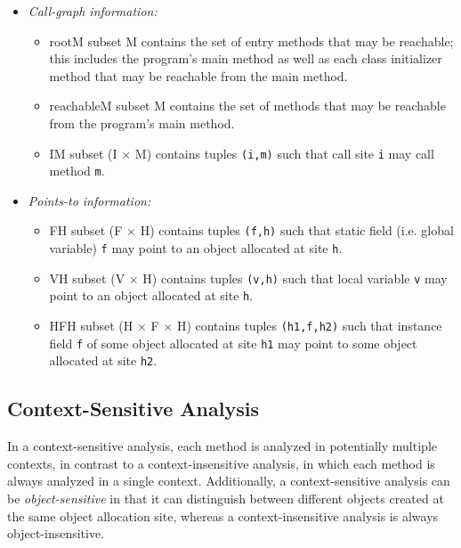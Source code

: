 \begin{itemize}
\item {\it Call-graph information:}
\begin{itemize}
\item
rootM subset M contains the set of entry methods that may be reachable; this
includes the program's main method as well as each class initializer method
that may be reachable from the main method.
\item
reachableM subset M contains the set of methods that may be reachable from the
program's main method.
\item
IM subset (I $\times$ M) contains tuples \texttt{(i,m)} such that call site
\texttt{i} may call method \texttt{m}.
\end{itemize}
\item
{\it Points-to information:}
\begin{itemize}
\item
FH subset (F $\times$ H) contains tuples \texttt{(f,h)} such that static field
(i.e.  global variable) \texttt{f} may point to an object allocated at site
\texttt{h}.
\item
VH subset (V $\times$ H) contains tuples \texttt{(v,h)} such that local variable
\texttt{v} may point to an object allocated at site \texttt{h}.
\item
HFH subset (H $\times$ F $\times$ H) contains tuples \texttt{(h1,f,h2)} such
that instance field \texttt{f} of some object allocated at site \texttt{h1} may
point to some object allocated at site \texttt{h2}.
\end{itemize}
\end{itemize}

\subsection{Context-Sensitive Analysis}

In a context-sensitive analysis, each method is analyzed in potentially multiple
contexts, in contrast to a context-insensitive analysis, in which each
method is always analyzed in a single context.  Additionally, a
context-sensitive analysis can be {\it object-sensitive} in that it can distinguish
between different objects created at the same object allocation site, whereas
a context-insensitive analysis is always object-insensitive.

